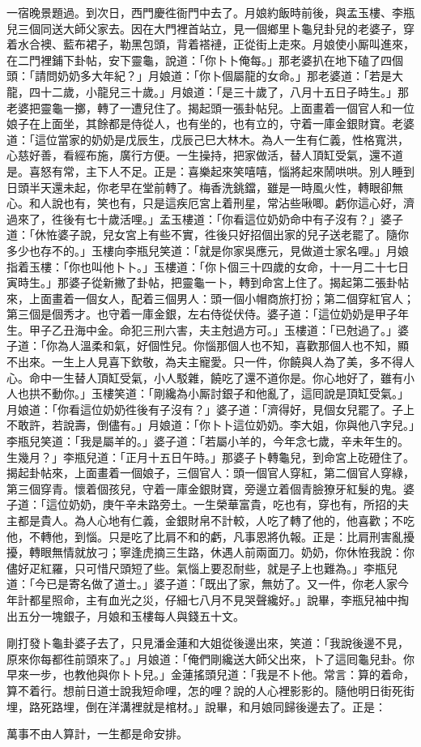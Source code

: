 一宿晚景題過。到次日，西門慶徃衙門中去了。月娘約飯時前後，與孟玉樓、李瓶兒三個同送大師父家去。因在大門裡首站立，見一個鄉里卜龜兒卦兒的老婆子，穿着水合襖、藍布裙子，勒黑包頭，背着褡褳，正從街上走來。月娘使小厮叫進來，在二門裡鋪下卦帖，安下靈龜，說道：「你卜卜俺每。」那老婆扒在地下磕了四個頭：「請問奶奶多大年紀？」月娘道：「你卜個屬龍的女命。」那老婆道：「若是大龍，四十二歲，小龍兒三十歲。」月娘道：「是三十歲了，八月十五日子時生。」那老婆把靈龜一擲，轉了一遭兒住了。揭起頭一張卦帖兒。上面畫着一個官人和一位娘子在上面坐，其餘都是侍從人，也有坐的，也有立的，守着一庫金銀財寶。老婆道：「這位當家的奶奶是戊辰生，戊辰己巳大林木。為人一生有仁義，性格寬洪，心慈好善，看經布施，廣行方便。一生操持，把家做活，替人頂缸受氣，還不道是。喜怒有常，主下人不足。正是：喜樂起來笑嘻嘻，惱將起來鬧哄哄。別人睡到日頭半天還未起，你老早在堂前轉了。梅香洗銚鐺，雖是一時風火性，轉眼卻無心。和人說也有，笑也有，只是這疾厄宮上着刑星，常沾些啾唧。虧你這心好，濟過來了，徃後有七十歲活哩。」孟玉樓道：「你看這位奶奶命中有子沒有？」婆子道：「休恠婆子說，兒女宮上有些不實，徃後只好招個出家的兒子送老罷了。隨你多少也存不的。」玉樓向李瓶兒笑道：「就是你家吳應元，見做道士家名哩。」月娘指着玉樓：「你也叫他卜卜。」玉樓道：「你卜個三十四歲的女命，十一月二十七日寅時生。」那婆子從新撇了卦帖，把靈龜一卜，轉到命宮上住了。揭起第二張卦帖來，上面畫着一個女人，配着三個男人：頭一個小帽商旅打扮；第二個穿紅官人；第三個是個秀才。也守着一庫金銀，左右侍從伏侍。婆子道：「這位奶奶是甲子年生。甲子乙丑海中金。命犯三刑六害，夫主尅過方可。」玉樓道：「已尅過了。」婆子道：「你為人溫柔和氣，好個性兒。你惱那個人也不知，喜歡那個人也不知，顯不出來。一生上人見喜下欽敬，為夫主寵愛。只一件，你饒與人為了美，多不得人心。命中一生替人頂缸受氣，小人駁雜，饒吃了還不道你是。你心地好了，雖有小人也拱不動你。」玉樓笑道：「剛纔為小厮討銀子和他亂了，這囘說是頂缸受氣。」月娘道：「你看這位奶奶徃後有子沒有？」婆子道：「濟得好，見個女兒罷了。子上不敢許，若說壽，倒儘有。」月娘道：「你卜卜這位奶奶。李大姐，你與他八字兒。」李瓶兒笑道：「我是屬羊的。」婆子道：「若屬小羊的，今年念七歲，辛未年生的。生幾月？」李瓶兒道：「正月十五日午時。」那婆子卜轉龜兒，到命宮上矻磴住了。揭起卦帖來，上面畫着一個娘子，三個官人：頭一個官人穿紅，第二個官人穿綠，第三個穿青。懷着個孩兒，守着一庫金銀財寶，旁邊立着個青臉獠牙紅髮的鬼。{}婆子道：「這位奶奶，庚午辛未路旁土。一生榮華富貴，吃也有，穿也有，所招的夫主都是貴人。為人心地有仁義，金銀財帛不計較，人吃了轉了他的，他喜歡；不吃他，不轉他，到惱。只是吃了比肩不和的虧，凡事恩將仇報。正是：比肩刑害亂擾擾，轉眼無情就放刁；寧逢虎摘三生路，休遇人前兩面刀。奶奶，你休恠我說：你儘好疋紅羅，只可惜尺頭短了些。氣惱上要忍耐些，就是子上也難為。」李瓶兒道：「今已是寄名做了道士。」婆子道：「既出了家，無妨了。又一件，你老人家今年計都星照命，主有血光之災，仔細七八月不見哭聲纔好。」說畢，李瓶兒袖中掏出五分一塊銀子，月娘和玉樓每人與錢五十文。

剛打發卜龜卦婆子去了，只見潘金蓮和大姐從後邊出來，笑道：「我說後邊不見，原來你每都徃前頭來了。」月娘道：「俺們剛纔送大師父出來，卜了這囘龜兒卦。你早來一步，也教他與你卜卜兒。」金蓮搖頭兒道：「我是不卜他。常言：算的着命，算不着行。想前日道士說我短命哩，怎的哩？說的人心裡影影的。隨他明日街死街埋，路死路埋，倒在洋溝裡就是棺材。」說畢，和月娘同歸後邊去了。正是：

\begin{myquote}
萬事不由人算計，一生都是命安排。
\end{myquote}

